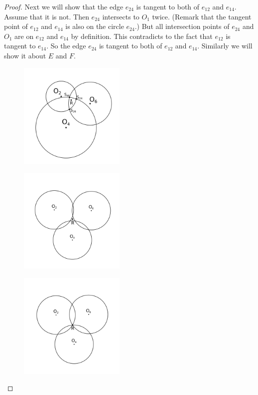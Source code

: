 \documentclass[suppldata, dvipdfmx]{interact}
\theoremstyle{plain}%
\theoremstyle{definition}
\theoremstyle{remark}
\theoremstyle{problemstyle}
\begin{document}
\begin{proof}
Next we will show that the edge $e_{24}$ is tangent to both of $e_{12}$ and
 $e_{14}$. Assume that it is not. Then $e_{24}$ intersects to $O_1$
 twice.
(Remark that the tangent point of $e_{12}$ and $e_{14}$ is also on the
 circle $e_{24}$.) But all intersection points of $e_{24}$ and $O_1$ are
 on $e_{12}$ and $e_{14}$ by definition. This contradicts to the fact
 that $e_{12}$ is tangent to $e_{14}$. So the edge $e_{24}$ is tangent
 to both of $e_{12}$ and $e_{14}$. Similarly we will show it about $E$
 and $F$.

\begin{figure}[h!tbp]
  \begin{minipage}[t]{0.3\textwidth}
   \centering
   \includegraphics[width=2in, keepaspectratio]{./img/HexahedraWithSphericalFaces/threeCircles1.png}
   \subcaption{}
   \label{fig:}
  \end{minipage}
 \hspace*{\fill}
  \begin{minipage}[t]{0.3\textwidth}
   \centering
   \includegraphics[width=2in, keepaspectratio]{./img/HexahedraWithSphericalFaces/threeCircles2.png}
   \subcaption{}
   \label{fig:}
  \end{minipage}
  \hspace*{\fill}
  \begin{minipage}[t]{0.3\textwidth}
   \centering
   \includegraphics[width=2in, keepaspectratio]{./img/HexahedraWithSphericalFaces/threeCircles3.png}
   \label{fig:}
  \end{minipage}
  \caption{\textit{}}
  \label{fig:threeCircles}
\end{figure}



\end{proof}
\end{document}
